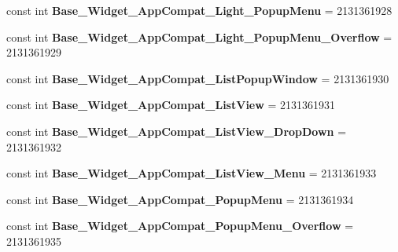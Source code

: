 \begin{DoxyCompactItemize}
\mbox{\label{classXaria_1_1Resource_1_1Style_a81bc78449b70cf5189cd144fd7ab59e9}} 
const int {\bfseries Base\+\_\+\+Widget\+\_\+\+App\+Compat\+\_\+\+Light\+\_\+\+Popup\+Menu} = 2131361928
\item 
\mbox{\label{classXaria_1_1Resource_1_1Style_ab5688a58df8472386f1bf8b092e03549}} 
const int {\bfseries Base\+\_\+\+Widget\+\_\+\+App\+Compat\+\_\+\+Light\+\_\+\+Popup\+Menu\+\_\+\+Overflow} = 2131361929
\item 
\mbox{\label{classXaria_1_1Resource_1_1Style_a12289ef1da3a4ad691bf4bc3c3d47c1c}} 
const int {\bfseries Base\+\_\+\+Widget\+\_\+\+App\+Compat\+\_\+\+List\+Popup\+Window} = 2131361930
\item 
\mbox{\label{classXaria_1_1Resource_1_1Style_aaa116708d6a88d6c693fcdf1905dd8d4}} 
const int {\bfseries Base\+\_\+\+Widget\+\_\+\+App\+Compat\+\_\+\+List\+View} = 2131361931
\item 
\mbox{\label{classXaria_1_1Resource_1_1Style_aa9273e01c2f1aace833b60da03450d3a}} 
const int {\bfseries Base\+\_\+\+Widget\+\_\+\+App\+Compat\+\_\+\+List\+View\+\_\+\+Drop\+Down} = 2131361932
\item 
\mbox{\label{classXaria_1_1Resource_1_1Style_af6bbeff6cf4c73541d99a001482ca776}} 
const int {\bfseries Base\+\_\+\+Widget\+\_\+\+App\+Compat\+\_\+\+List\+View\+\_\+\+Menu} = 2131361933
\item 
\mbox{\label{classXaria_1_1Resource_1_1Style_a41361e4ac2a3e74a9f20218035544688}} 
const int {\bfseries Base\+\_\+\+Widget\+\_\+\+App\+Compat\+\_\+\+Popup\+Menu} = 2131361934
\item 
\mbox{\label{classXaria_1_1Resource_1_1Style_a0a5d2fbd5cb6f1c44622388b87390b72}} 
const int {\bfseries Base\+\_\+\+Widget\+\_\+\+App\+Compat\+\_\+\+Popup\+Menu\+\_\+\+Overflow} = 2131361935
\item 
\mbox{\label{classXaria_1_1Resource_1_1Style_a24c8c93d0b086ad495629eb2bda6a6bd}} 

\end{DoxyCompactItemize}
